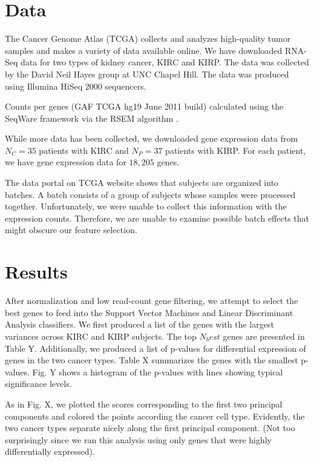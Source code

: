 \section{Data}

The Cancer Genome Atlas (TCGA) collects and analyzes high-quality tumor samples
and makes a variety of data available online. We have downloaded RNA-Seq data
for two types of kidney cancer, KIRC and KIRP. The data was collected by the David
Neil Hayes group at UNC Chapel Hill. The data was produced using Illumina HiSeq
2000 sequencers. 

Counts per genes (GAF TCGA hg19 June 2011 build) calculated using the SeqWare
framework via the RSEM algorithm \cite{li2011rsem}.

While more data has been collected, we downloaded gene expression data from
$N_C =35$ patients with KIRC and $N_P = 37$ patients with KIRP.  For each
patient, we have gene expression data for $18,205$ genes. 

The data portal on TCGA website shows that subjects are organized into batches. A batch consists of
a group of subjects whose samples were processed together. Unfortunately,
we were unable to collect this information with the expression counts. Therefore, we are 
unable to examine possible batch effects that might obscure our feature selection. 

\section{Results}

After normalization and low read-count gene filtering, we attempt to select the best
genes to feed into the Support Vector Machines and Linear Discriminant Analysis classifiers.
We first produced a list of the genes with the largest variances across KIRC and KIRP subjects.
The top $N_best$ genes are presented in Table Y. Additionally, we produced a list of p-values
 for differential expression of genes in the two cancer types. Table X summarizes the genes with 
 the smallest p-values. Fig. Y shows a histogram of the p-values with lines showing typical 
 significance levels. 
 
As in Fig. X, we plotted the scores corresponding to the first two principal
components and colored the points according the cancer cell type. 
Evidently, the two cancer types separate nicely along the first
principal component. (Not too surprisingly since we ran this analysis using
only genes that were highly differentially expressed).  

